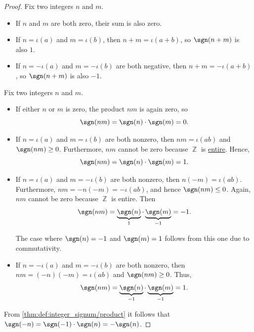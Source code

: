 \begin{proof}
   Fix two integers \( n \) and \( m \).

  \begin{itemize}
    \item If \( n \) and \( m \) are both zero, their sum is also zero.
    \item If \( n = \iota(a) \) and \( m = \iota(b) \), then \( n + m = \iota(a + b) \), so \( \sgn(n + m) \) is also \( 1 \).
    \item If \( n = -\iota(a) \) and \( m = -\iota(b) \) are both negative, then \( n + m = -\iota(a + b) \), so \( \sgn(n + m) \) is also \( -1 \).
  \end{itemize}

   Fix two integers \( n \) and \( m \).

  \begin{itemize}
    \item If either \( n \) or \( m \) is zero, the product \( nm \) is again zero, so
    \begin{equation*}
      \sgn(nm) = \sgn(n) \cdot \sgn(m) = 0.
    \end{equation*}

    \item If \( n = \iota(a) \) and \( m = \iota(b) \) are both nonzero, then \( nm = \iota(ab) \) and \( \sgn(nm) \geq 0 \). Furthermore, \( nm \) cannot be zero because \( \BbbZ \) is \hyperref[def:entire_semiring]{entire}. Hence,
    \begin{equation*}
      \sgn(nm) = \sgn(n) \cdot \sgn(m) = 1.
    \end{equation*}

    \item If \( n = \iota(a) \) and \( m = -\iota(b) \) are both nonzero, then \( n(-m) = \iota(ab) \). Furthermore, \( nm = -n(-m) = -\iota(ab) \), and hence \( \sgn(nm) \leq 0 \). Again, \( nm \) cannot be zero because \( \BbbZ \) is entire. Then
    \begin{equation*}
      \sgn(nm) = \underbrace{\sgn(n)}_1 \cdot \underbrace{\sgn(m)}_{-1} = -1.
    \end{equation*}

    The case where \( \sgn(n) = -1 \) and \( \sgn(m) = 1 \) follows from this one due to commutativity.

    \item If \( n = -\iota(a) \) and \( m = -\iota(b) \) are both nonzero, then \( nm = (-n)(-m) = \iota(ab) \) and \( \sgn(nm) \geq 0 \). Thus,
    \begin{equation*}
      \sgn(nm) = \underbrace{\sgn(n)}_{-1} \cdot \underbrace{\sgn(m)}_{-1} = 1.
    \end{equation*}
  \end{itemize}

   From \cref{thm:def:integer_signum/product} it follows that \( \sgn(-n) = \sgn(-1) \cdot \sgn(n) = -\sgn(n) \).
\end{proof}

